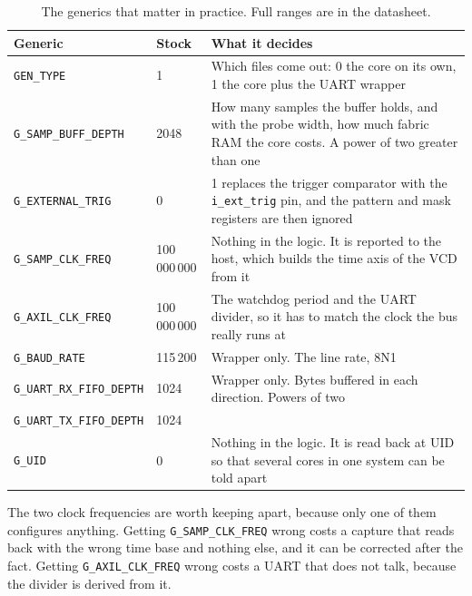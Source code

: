 \documentclass[../manual.tex]{subfiles}
\begin{document}
\begin{table}[H]
    \centering
    \begin{tabularx}{\textwidth}{|l|l|X|}
        \hline
        \rowcolor{gray!40} \textbf{Generic} & \textbf{Stock} & \textbf{What it decides} \\
        \hline
        \texttt{GEN\_TYPE} & 1 & Which files come out: 0 the core on its own, 1 the core plus the UART wrapper \\
        \hline
        \texttt{G\_SAMP\_BUFF\_DEPTH} & 2048 & How many samples the buffer holds, and with the probe width, how much fabric RAM the core costs. A power of two greater than one \\
        \hline
        \texttt{G\_EXTERNAL\_TRIG} & 0 & 1 replaces the trigger comparator with the \texttt{i\_ext\_trig} pin, and the pattern and mask registers are then ignored \\
        \hline
        \texttt{G\_SAMP\_CLK\_FREQ} & 100\,000\,000 & Nothing in the logic. It is reported to the host, which builds the time axis of the VCD from it \\
        \hline
        \texttt{G\_AXIL\_CLK\_FREQ} & 100\,000\,000 & The watchdog period and the UART divider, so it has to match the clock the bus really runs at \\
        \hline
        \texttt{G\_BAUD\_RATE} & 115\,200 & Wrapper only. The line rate, 8N1 \\
        \hline
        \texttt{G\_UART\_RX\_FIFO\_DEPTH} & 1024 & Wrapper only. Bytes buffered in each direction. Powers of two \\
        \texttt{G\_UART\_TX\_FIFO\_DEPTH} & 1024 & \\
        \hline
        \texttt{G\_UID} & 0 & Nothing in the logic. It is read back at UID so that several cores in one system can be told apart \\
        \hline
    \end{tabularx}
    \caption{The generics that matter in practice. Full ranges are in the datasheet.}
    \label{tab:codegen_generics}
\end{table}

The two clock frequencies are worth keeping apart, because only one of them configures anything. Getting \texttt{G\_SAMP\_CLK\_FREQ} wrong costs a capture that reads back with the wrong time base and nothing else, and it can be corrected after the fact. Getting \texttt{G\_AXIL\_CLK\_FREQ} wrong costs a UART that does not talk, because the divider is derived from it.
\end{document}
